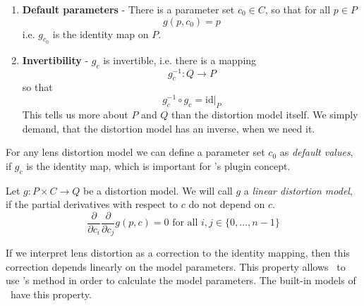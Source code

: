 \documentclass[10pt,a4paper]{article}
\begin{document}
\begin{defn}
\begin{enumerate}
\item{\bf Default parameters} - There is a parameter set $c_0\in C$, so that for all $p\in P$
\begin{equation}
g(p,c_0) = p
\end{equation}
i.e. $g_{c_0}$ is the identity map on $P$.

\item {\bf Invertibility} - $g_c$ is invertible, i.e. there is a mapping
\begin{equation}
g_c^{-1}: Q \rightarrow P
\end{equation}
so that
\begin{equation}
g_c^{-1}\circ g_c = \left.\mathrm{id}\right|_P
\end{equation}
This tells us more about $P$ and $Q$ than the distortion model itself.
We simply demand, that the distortion model has an inverse, when we need it.
\end{enumerate}
\end{defn}
\begin{rmrk}
For any lens distortion model we can define a parameter set $c_0$ as {\em default values},
if $g_c$ is the identity map, which is important for \tde's plugin concept.
\end{rmrk}
%
\begin{defn}
\label{def:LinearDistortionModel}
Let $g:P\times C \rightarrow Q$ be a distortion model.
We will call $g$ a {\em linear distortion model}, if the partial derivatives with respect
to $c$ do not depend on $c$.
\begin{equation}
\frac \partial {\partial c_i} \frac \partial {\partial c_j} g(p,c) = 0
\text{\ \ \ for all\ } i,j \in\{0,\ldots,n-1\}
\end{equation}
\end{defn}
\begin{rmrk}
If we interpret lens distortion as a correction to the identity mapping, then
this correction depends linearly on the model parameters.
This property allows \tde\ to use \Newton's method in order to calculate the model parameters.
The built-in models of \tde\ have this property.
\end{rmrk}
\end{document}
